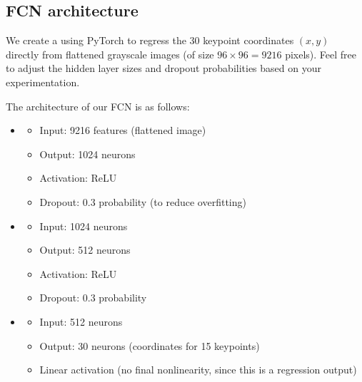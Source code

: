 \documentclass[letterpaper,10pt,english]{jupyterBook}
\begin{document}
\subsection{FCN architecture}
\label{\detokenize{04:fcn-architecture}}
\sphinxAtStartPar
We create a  using PyTorch to regress the 30 keypoint coordinates \((x, y)\) directly from flattened grayscale images (of size \(96 \times 96 = 9216\) pixels). Feel free to adjust the hidden layer sizes and dropout probabilities based on your experimentation.

\sphinxAtStartPar
The architecture of our FCN is as follows:
\begin{itemize}
\item {} 
\sphinxAtStartPar
{}
\begin{itemize}
\item {} 
\sphinxAtStartPar
Input: 9216 features (flattened image)

\item {} 
\sphinxAtStartPar
Output: 1024 neurons

\item {} 
\sphinxAtStartPar
Activation: ReLU

\item {} 
\sphinxAtStartPar
Dropout: 0.3 probability (to reduce overfitting)

\end{itemize}

\item {} 
\sphinxAtStartPar
{}
\begin{itemize}
\item {} 
\sphinxAtStartPar
Input: 1024 neurons

\item {} 
\sphinxAtStartPar
Output: 512 neurons

\item {} 
\sphinxAtStartPar
Activation: ReLU

\item {} 
\sphinxAtStartPar
Dropout: 0.3 probability

\end{itemize}

\item {} 
\sphinxAtStartPar
{}
\begin{itemize}
\item {} 
\sphinxAtStartPar
Input: 512 neurons

\item {} 
\sphinxAtStartPar
Output: 30 neurons (coordinates for 15 keypoints)

\item {} 
\sphinxAtStartPar
Linear activation (no final nonlinearity, since this is a regression output)

\end{itemize}

\end{itemize}
\end{document}
